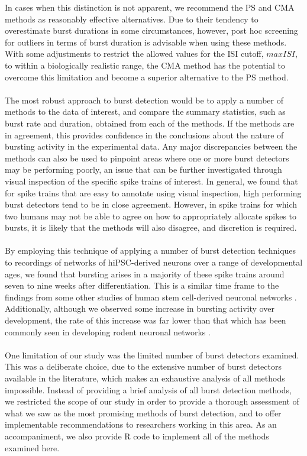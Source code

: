 \documentclass[12pt, titlepage]{article}
\begin{document}
	In cases when this distinction is not apparent, we recommend the PS and CMA methods as reasonably effective alternatives. Due to their tendency to overestimate burst durations in some circumstances, however, post hoc screening for outliers in terms of burst duration is advisable when using these methods. With some adjustments to restrict the allowed values for the ISI cutoff, $maxISI$, to within a biologically realistic range, the CMA method has the potential to overcome this limitation and become a superior alternative to the PS method.
	\\ \\The most robust approach to burst detection would be to apply a number of methods to the data of interest, and compare the summary statistics, such as burst rate and duration, obtained from each of the methods. %
	If the methods are in agreement, this provides confidence in the conclusions about the nature of bursting activity in the experimental data. Any major discrepancies between the methods can also be used to pinpoint areas where one or more burst detectors may be performing poorly, an issue that can be further investigated through visual inspection of the specific spike trains of interest. In general, we found that for spike trains that are easy to annotate using visual inspection, high performing burst detectors tend to be in close agreement. However, in spike trains for which two humans may not be able to agree on how to appropriately allocate spikes to bursts, it is likely that the methods will also disagree, and discretion is required.
	\\ \\By employing this technique of applying a number of burst detection techniques to recordings of networks of hiPSC-derived neurons over a range of developmental ages, we found that bursting arises in a majority of these spike trains around seven to nine weeks after differentiation.  This is a similar time frame to the findings from some other studies of human stem cell-derived neuronal networks \cite{Heikkila2009,Kirwan2015}. Additionally, although we observed some increase in bursting activity over development, the rate of this increase was far lower than that which has been commonly seen in developing rodent neuronal networks \cite{Chiappalone2005,Charlesworth2015,Demas2003}.
	\\ \\One limitation of our study was the limited number of burst detectors examined. This was a deliberate choice, due to the extensive number of burst detectors available in the literature, which makes an exhaustive analysis of all methods impossible. Instead of providing a brief analysis of all burst detection methods, we restricted the scope of our study in order to provide a thorough assessment of what we saw as the most promising methods of burst detection, and to offer implementable recommendations to researchers working in this area. As an accompaniment, we also provide R code to implement all of the methods examined here.
\end{document}
